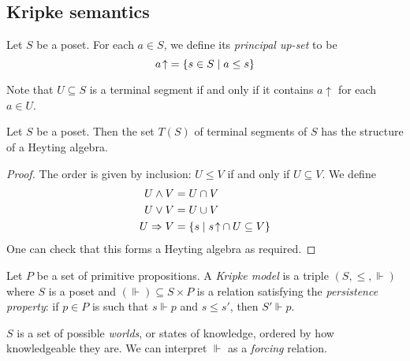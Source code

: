 \subsection{Kripke semantics}
\begin{definition}
    Let \( S \) be a poset.
    For each \( a \in S \), we define its \emph{principal up-set} to be
    \[ {a\!\uparrow} = \qty{s \in S \mid a \leq s} \]
\end{definition}
Note that \( U \subseteq S \) is a terminal segment if and only if it contains \( a\!\uparrow \) for each \( a \in U \).
\begin{proposition}
    Let \( S \) be a poset.
    Then the set \( T(S) \) of terminal segments of \( S \) has the structure of a Heyting algebra.
\end{proposition}
\begin{proof}
    The order is given by inclusion: \( U \leq V \) if and only if \( U \subseteq V \).
    We define
    \begin{align*}
        U \wedge V &= U \cap V \\
        U \vee V &= U \cup V \\
        U \Rightarrow V &= \qty{s \mid {s\!\uparrow} \cap U \subseteq V}
    \end{align*}
    One can check that this forms a Heyting algebra as required.
\end{proof}
\begin{definition}
    Let \( P \) be a set of primitive propositions.
    A \emph{Kripke model} is a triple \( (S, \leq, \Vdash) \) where \( S \) is a poset and \( (\Vdash) \subseteq S \times P \) is a relation satisfying the \emph{persistence property}: if \( p \in P \) is such that \( s \Vdash p \) and \( s \leq s' \), then \( S' \Vdash p \).
\end{definition}
\( S \) is a set of possible \emph{worlds}, or states of knowledge, ordered by how knowledgeable they are.
We can interpret \( \Vdash \) as a \emph{forcing} relation.

